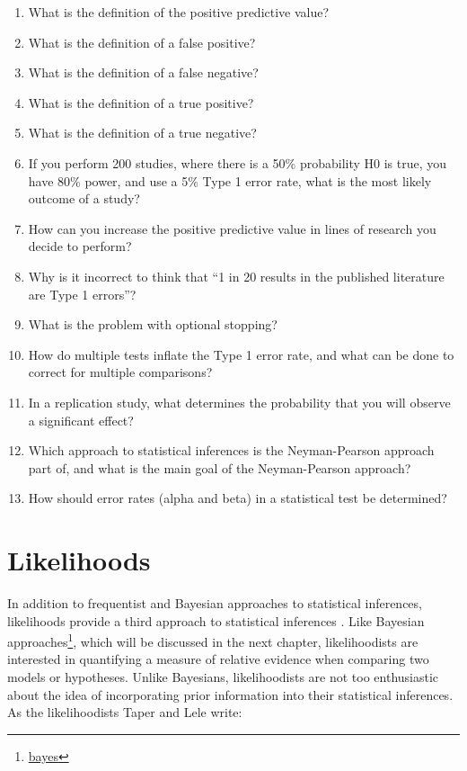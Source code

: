 \documentclass[
  oneside]{krantz}
\renewcommand{\href}[2]{#2\footnote{\url{#1}}}
\begin{document}
\begin{enumerate}
\def\labelenumi{\arabic{enumi}.}
\item
  What is the definition of the positive predictive value?
\item
  What is the definition of a false positive?
\item
  What is the definition of a false negative?
\item
  What is the definition of a true positive?
\item
  What is the definition of a true negative?
\item
  If you perform 200 studies, where there is a 50\% probability H0 is true, you have 80\% power, and use a 5\% Type 1 error rate, what is the most likely outcome of a study?
\item
  How can you increase the positive predictive value in lines of research you decide to perform?
\item
  Why is it incorrect to think that ``1 in 20 results in the published literature are Type 1 errors''?
\item
  What is the problem with optional stopping?
\item
  How do multiple tests inflate the Type 1 error rate, and what can be done to correct for multiple comparisons?
\item
  In a replication study, what determines the probability that you will observe a significant effect?
\item
  Which approach to statistical inferences is the Neyman-Pearson approach part of, and what is the main goal of the Neyman-Pearson approach?
\item
  How should error rates (alpha and beta) in a statistical test be determined?
\end{enumerate}

\hypertarget{likelihoods}{%
\chapter{Likelihoods}\label{likelihoods}}

In addition to frequentist and Bayesian approaches to statistical inferences, likelihoods provide a third approach to statistical inferences \citep{pawitan_all_2001, dienes_understanding_2008}. Like \href{bayes}{Bayesian approaches}, which will be discussed in the next chapter, likelihoodists are interested in quantifying a measure of relative evidence when comparing two models or hypotheses. Unlike Bayesians, likelihoodists are not too enthusiastic about the idea of incorporating prior information into their statistical inferences. As the likelihoodists Taper and Lele \citeyearpar{taper_philosophy_2011} write:
\end{document}
